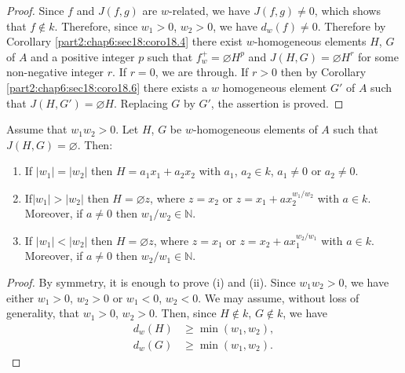 \begin{proof}
  Since $f$ and $J(f, g)$ are $w$-related, we have $J(f, g)\neq 0$,
  which shows that $f \notin k$. Therefore, since $w_1> 0$, $w_2>0$,
  we have $d_w (f) \neq 0$. Therefore by
  Corollary \ref{part2:chap6:sec18:coro18.4} there exist
  $w$-homogeneous elements $H$, $G$ of $A$ and a positive integer $p$
  such that $f^+_w= \diameter H^p$ and $J(H, G)= \diameter H^r$ for
  some non-negative integer $r$. If $r=0$, we are through. If $r>0$
  then by Corollary \ref{part2:chap6:sec18:coro18.6} there exists a
  $w$ homogeneous element $G'$ of $A$ such that $J(H, G')= \diameter
  H$. Replacing $G$ by $G'$, the assertion is proved.
\end{proof}

\begin{lemma}\label{part2:chap6:sec18:lem18.8}
  Assume that $w_1 w_2 > 0$. Let $H$, $G$ be $w$-homogeneous elements
  of $A$ such that $J(H, G)= \diameter$. Then:
  \begin{enumerate}[\rm (i)]
    \item If $|w_1|= |w_2|$ then $H= a_1 x_1+ a_2 x_2$ with $a_1$,
      $a_2 \in k$, $a_1 \neq 0$ or $a_2 \neq 0$.
      \item If\pageoriginale $|w_1|> |w_2|$ then $H = \diameter z$,
        where $z= x_2$ or $z= x_1 + ax_2^{w_1/w_2}$ with $a\in
        k$. Moreover, if $a \neq 0$ then $w_1/w_2 \in \mathbb{N}$.
      \item If $|w_1|< |w_2|$ then $H= \diameter z$, where $z= x_1$ or
        $z= x_2 + ax_1^{w_2/w_1}$ with $a \in k$. Moreover, if $a \neq
        0$ then $w_2/w_1 \in \mathbb{N}$.
  \end{enumerate}
\end{lemma}

\begin{proof}
  By symmetry, it is enough to prove (i) and (ii). Since $w_1 w_2> 0$,
  we have either $w_1> 0$, $w_2 > 0$ or $w_1< 0$, $w_2< 0$. We may
  assume, without loss of generality, that $w_1 > 0$, $w_2> 0$. Then,
  since $H \notin k$, $G \notin k$, we have 
\begin{equation*}
  \begin{aligned}
    d_w (H) & \geq \min (w_1, w_2),\\
    d_w (G) & \geq \min (w_1, w_2).
  \end{aligned}\tag{18.8.1} \label{part2:chap6:sec18:eq18.8.1}
\end{equation*}
\end{proof}

